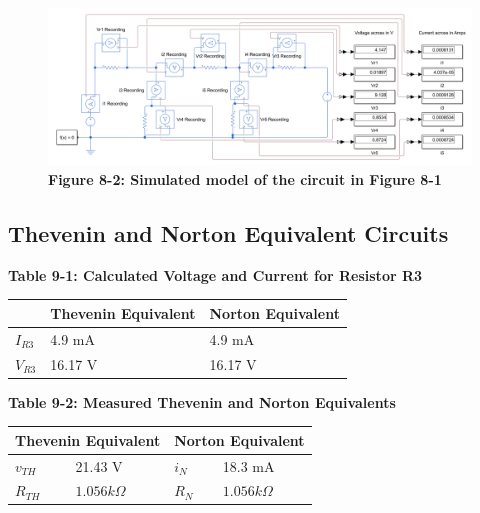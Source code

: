 \documentclass[a4paper]{article}
\begin{document}
\begin{center}
    \begin{figure}[H]\label{fig8-2}
        \begin{center}
            \includegraphics[width = 16 cm]{Figure_8-1}\\
            \small\textbf{Figure 8-2: Simulated model of the circuit in Figure 8-1}\\    
        \end{center}
    \end{figure}
\end{center}

\pagebreak

\subsection{Thevenin and Norton Equivalent Circuits}


\begin{center}
    \small\textbf{Table 9-1: Calculated Voltage and Current for Resistor R3}
    \begin{tabular}{|p{3 cm}|p{3cm}|p{3 cm}|}
        \hline
         & Thevenin Equivalent & Norton Equivalent\\
        \hline
        $I_{R3}$ & 4.9 mA & 4.9 mA  \\
        \hline
        $V_{R3}$ & 16.17 V & 16.17 V  \\
        \hline
        
    \end{tabular}
\end{center}

\begin{center}
    \small\textbf{Table 9-2: Measured Thevenin and Norton Equivalents}
    \begin{tabular}{|p{3 cm}|p{3cm}|p{3 cm}|p{3 cm}|}      
        \hline
        \multicolumn{2}{|c|}{Thevenin Equivalent} & \multicolumn{2}{|c|}{Norton Equivalent}  \\
        \hline
        $v_{TH}$ & 21.43 V & $i_{N}$ & 18.3 mA \\
        \hline
        $R_{TH}$ & $1.056k\Omega$ & $R_{N}$ & $1.056k\Omega$ \\
        \hline
    \end{tabular}
\end{center}
\end{document}
